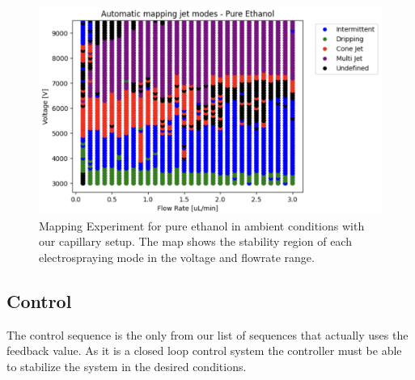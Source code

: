     \begin{figure}[H]
        \center
        \includegraphics[width=15cm]{Figuras/report4/map-2023-03-02.png}
        \caption{Mapping Experiment for pure ethanol in ambient conditions with our capillary setup. The map shows the stability region of each electrospraying mode in the voltage and flowrate range.}
        \label{fig:map3Data_fig}
    \end{figure}



\subsection{Control}

    The control sequence is the only from our list of sequences that actually uses the feedback value. 
    As it is a closed loop control system the controller must be able to stabilize the system in the desired conditions.






\clearpage